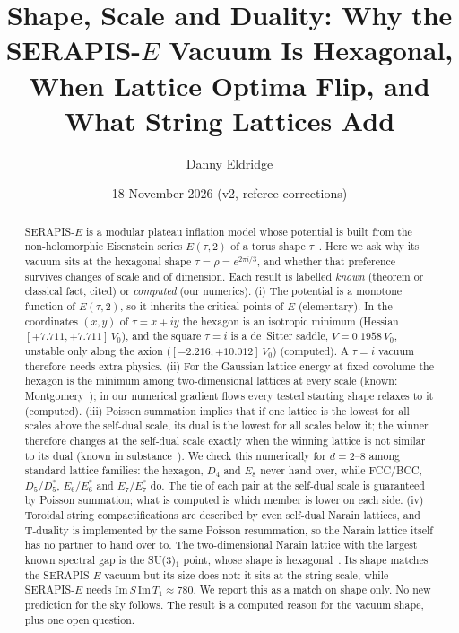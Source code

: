 \documentclass[aps,prd,twocolumn,superscriptaddress,nofootinbib,showkeys]{revtex4-2}
\begin{document}
\title{Shape, Scale and Duality: Why the SERAPIS-$E$ Vacuum Is Hexagonal, When Lattice Optima Flip, and What String Lattices Add}
\author{Danny Eldridge}
\date{18 November 2026 (v2, referee corrections)}
\begin{abstract}
SERAPIS-$E$ is a modular plateau inflation model whose potential is built from the non-holomorphic Eisenstein series $E(\tau,2)$ of a torus shape $\tau$~\cite{P3,P5}. Here we ask why its vacuum sits at the hexagonal shape $\tau=\rho=e^{2\pi i/3}$, and whether that preference survives changes of scale and of dimension. Each result is labelled \emph{known} (theorem or classical fact, cited) or \emph{computed} (our numerics). (i) The potential is a monotone function of $E(\tau,2)$, so it inherits the critical points of $E$ (elementary). In the coordinates $(x,y)$ of $\tau=x+iy$ the hexagon is an isotropic minimum (Hessian $[+7.711,+7.711]\,V_0$), and the square $\tau=i$ is a de~Sitter saddle, $V=0.1958\,V_0$, unstable only along the axion ($[-2.216,+10.012]\,V_0$) (computed). A $\tau=i$ vacuum therefore needs extra physics. (ii) For the Gaussian lattice energy at fixed covolume the hexagon is the minimum among two-dimensional lattices at every scale (known: Montgomery~\cite{Montgomery}); in our numerical gradient flows every tested starting shape relaxes to it (computed). (iii) Poisson summation implies that if one lattice is the lowest for all scales above the self-dual scale, its dual is the lowest for all scales below it; the winner therefore changes at the self-dual scale exactly when the winning lattice is not similar to its dual (known in substance~\cite{CKS}). We check this numerically for $d=2$--8 among standard lattice families: the hexagon, $D_4$ and $E_8$ never hand over, while FCC/BCC, $D_5/D_5^*$, $E_6/E_6^*$ and $E_7/E_7^*$ do. The tie of each pair at the self-dual scale is guaranteed by Poisson summation; what is computed is which member is lower on each side. (iv) Toroidal string compactifications are described by even self-dual Narain lattices, and T-duality is implemented by the same Poisson resummation, so the Narain lattice itself has no partner to hand over to. The two-dimensional Narain lattice with the largest known spectral gap is the SU(3)$_1$ point, whose shape is hexagonal~\cite{ACD}. Its shape matches the SERAPIS-$E$ vacuum but its size does not: it sits at the string scale, while SERAPIS-$E$ needs $\mathrm{Im}\,S\,\mathrm{Im}\,T_1\approx780$. We report this as a match on shape only. No new prediction for the sky follows. The result is a computed reason for the vacuum shape, plus one open question.
\end{abstract}
\maketitle
\end{document}
